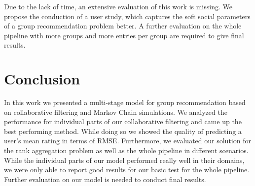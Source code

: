 \documentclass[a4paper]{article}
\begin{document}
Due to the lack of time, an extensive evaluation of this work is missing. We propose the conduction of a user study, which captures the soft social parameters of a group recommendation problem better. A further evaluation on the whole pipeline with more groups and more entries per group are required to give final results.

\section{Conclusion}\label{sec:Conclusion}
In this work we presented a multi-stage model for group recommendation based on collaborative filtering and Markov Chain simulations. We analyzed the performance for individual parts of our collaborative filtering and came up the best performing method. While doing so we showed the quality of predicting a user's mean rating in terms of RMSE. Furthermore, we evaluated our solution for the rank aggregation problem as well as the whole pipeline in different scenarios. While the individual parts of our model performed really well in their domains, we were only able to report good results for our basic test for the whole pipeline. Further evaluation on our model is needed to conduct final results.



\end{document}
